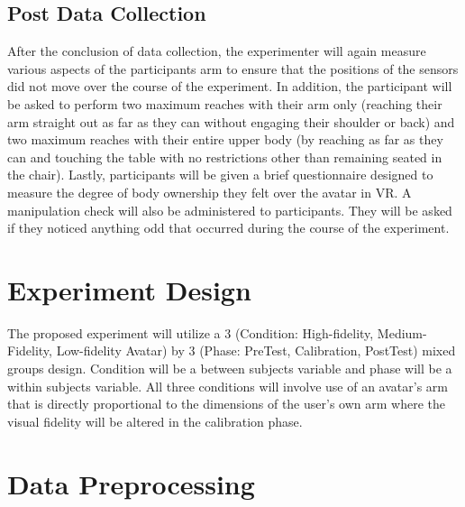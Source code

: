 \subsection{Post Data Collection}
After the conclusion of data collection, the experimenter will again measure various aspects of the participants arm to ensure that the positions of the sensors did not move over the course of the experiment. In addition, the participant will be asked to perform two maximum reaches with their arm only (reaching their arm straight out as far as they can without engaging their shoulder or back) and two maximum reaches with their entire upper body (by reaching as far as they can and touching the table with no restrictions other than remaining seated in the chair). Lastly, participants will be given a brief questionnaire designed to measure the degree of body ownership they felt over the avatar in VR. A manipulation check will also be administered to participants. They will be asked if they noticed anything odd that occurred during the course of the experiment.

\section{Experiment Design} \label{ExpDesign}
The proposed experiment will utilize a 3 (Condition: High-fidelity, Medium-Fidelity, Low-fidelity Avatar) by 3 (Phase: PreTest, Calibration, PostTest) mixed groups design. Condition will be a between subjects variable and phase will be a within subjects variable. All three conditions will involve use of an avatar’s arm that is directly proportional to the dimensions of the user’s own arm where the visual fidelity will be altered in the calibration phase. 

\section{Data Preprocessing}

